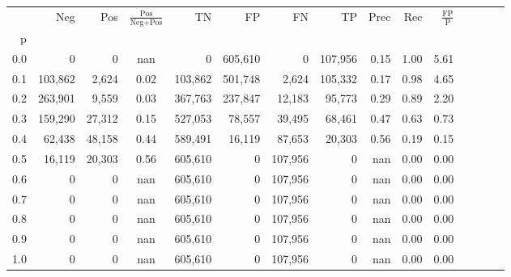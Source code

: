 \begin{tabular}{rrrcrrrrrrrrrrr}
\toprule
{} &      Neg &     Pos & $\frac{\text{Pos}}{\text{Neg}+\text{Pos}}$ &       TN &       FP &       FN &       TP &  Prec &   Rec & $\frac{\text{FP}}{\text{P}}$ \\
p   &          &         &                                            &          &          &          &          &       &       &                              \\
\midrule
0.0 &        0 &       0 &                                        nan &        0 &  605,610 &        0 &  107,956 &  0.15 &  1.00 &                         5.61 \\
0.1 &  103,862 &   2,624 &                                       0.02 &  103,862 &  501,748 &    2,624 &  105,332 &  0.17 &  0.98 &                         4.65 \\
0.2 &  263,901 &   9,559 &                                       0.03 &  367,763 &  237,847 &   12,183 &   95,773 &  0.29 &  0.89 &                         2.20 \\
0.3 &  159,290 &  27,312 &                                       0.15 &  527,053 &   78,557 &   39,495 &   68,461 &  0.47 &  0.63 &                         0.73 \\
0.4 &   62,438 &  48,158 &                                       0.44 &  589,491 &   16,119 &   87,653 &   20,303 &  0.56 &  0.19 &                         0.15 \\
0.5 &   16,119 &  20,303 &                                       0.56 &  605,610 &        0 &  107,956 &        0 &   nan &  0.00 &                         0.00 \\
0.6 &        0 &       0 &                                        nan &  605,610 &        0 &  107,956 &        0 &   nan &  0.00 &                         0.00 \\
0.7 &        0 &       0 &                                        nan &  605,610 &        0 &  107,956 &        0 &   nan &  0.00 &                         0.00 \\
0.8 &        0 &       0 &                                        nan &  605,610 &        0 &  107,956 &        0 &   nan &  0.00 &                         0.00 \\
0.9 &        0 &       0 &                                        nan &  605,610 &        0 &  107,956 &        0 &   nan &  0.00 &                         0.00 \\
1.0 &        0 &       0 &                                        nan &  605,610 &        0 &  107,956 &        0 &   nan &  0.00 &                         0.00 \\
\bottomrule
\end{tabular}
